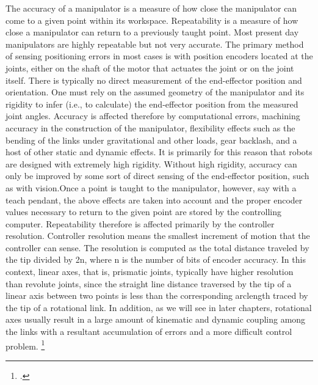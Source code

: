 \begin{em}
The accuracy of a manipulator is a measure of how close the manipulator can come to
a given point within its workspace. Repeatability is a measure of how close a manipulator can return to a previously taught point. Most present day manipulators are highly
repeatable but not very accurate. The primary method of sensing positioning errors in
most cases is with position encoders located at the joints, either on the shaft of the motor
that actuates the joint or on the joint itself. There is typically no direct measurement of
the end-effector position and orientation. One must rely on the assumed geometry of the
manipulator and its rigidity to infer (i.e., to calculate) the end-effector position from the
measured joint angles. Accuracy is affected therefore by computational errors, machining
accuracy in the construction of the manipulator, flexibility effects such as the bending of
the links under gravitational and other loads, gear backlash, and a host of other static and
dynamic effects. It is primarily for this reason that robots are designed with extremely
high rigidity. Without high rigidity, accuracy can only be improved by some sort of direct sensing of the end-effector position, such as with vision.Once a point is taught to the manipulator, however, say with a teach pendant, the above
effects are taken into account and the proper encoder values necessary to return to the given
point are stored by the controlling computer. Repeatability therefore is affected primarily by
the controller resolution. Controller resolution means the smallest increment of motion
that the controller can sense. The resolution is computed as the total distance traveled by
the tip divided by 2n, where n is the number of bits of encoder accuracy. In this context,
linear axes, that is, prismatic joints, typically have higher resolution than revolute joints,
since the straight line distance traversed by the tip of a linear axis between two points is
less than the corresponding arclength traced by the tip of a rotational link.
In addition, as we will see in later chapters, rotational axes usually result in a large
amount of kinematic and dynamic coupling among the links with a resultant accumulation
of errors and a more difficult control problem. \footcite[Vgl.][20-21]{Spong2004}
\end{em}

